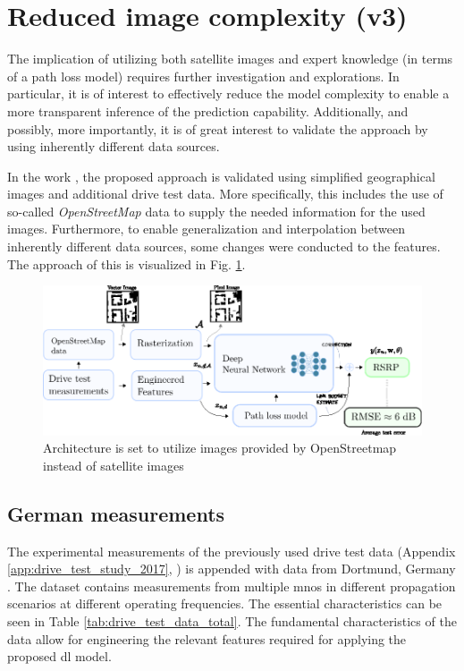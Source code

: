 \section{Reduced image complexity (v3)}
The implication of utilizing both satellite images and expert knowledge (in terms of a path loss model) requires further investigation and explorations. In particular, it is of interest to effectively reduce the model complexity to enable a more transparent inference of the prediction capability. Additionally, and possibly, more importantly, it is of great interest to validate the approach by using inherently different data sources. 

In the work \cite{Thrane2020DeepKnowledge}, the proposed approach is validated using simplified geographical images and additional drive test data. More specifically, this includes the use of so-called \emph{OpenStreetMap} data to supply the needed information for the used images. Furthermore, to enable generalization and interpolation between inherently different data sources, some changes were conducted to the features. The approach of this is visualized in Fig. \ref{fig:version3_architecture_figure}.

\begin{figure}
    \centering
    \includegraphics{chapters/part_pathloss/osm_images_paper/figures/version3_architecture_figure.eps}
    \caption{Architecture is set to utilize images provided by OpenStreetmap instead of satellite images}
    \label{fig:version3_architecture_figure}
\end{figure}




\subsection{German measurements}

The experimental measurements of the previously used drive test data  (Appendix \ref{app:drive_test_study_2017}, \cite{1xf4-eg98-19}) is appended with data from Dortmund, Germany \cite{SliwaEmpiricalNetworks}. The dataset contains measurements from multiple \glspl{mno} in different propagation scenarios at different operating frequencies. The essential characteristics can be seen in Table \ref{tab:drive_test_data_total}. The fundamental characteristics of the data allow for engineering the relevant features required for applying the proposed \gls{dl} model.

